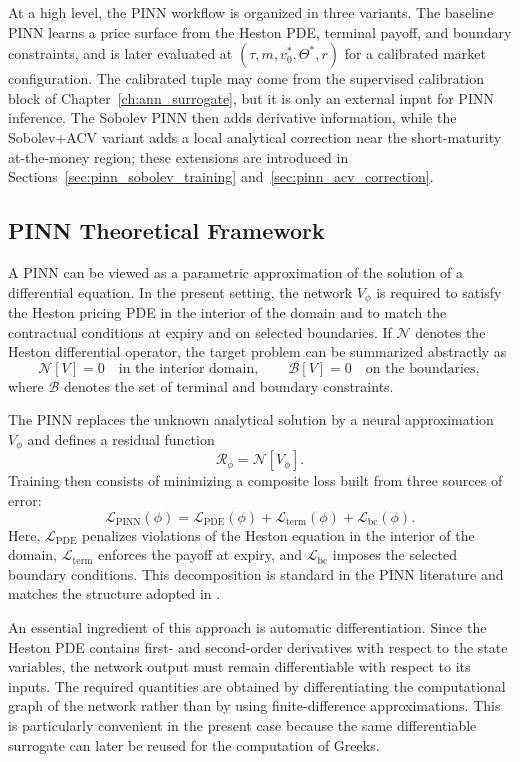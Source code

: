 At a high level, the PINN workflow is organized in three variants. The baseline PINN learns a price surface from the Heston PDE, terminal payoff, and boundary constraints, and is later evaluated at $(\tau,m,v_0^*,\Theta^*,r)$ for a calibrated market configuration. The calibrated tuple may come from the supervised calibration block of Chapter~\ref{ch:ann_surrogate}, but it is only an external input for PINN inference. The Sobolev PINN then adds derivative information, while the Sobolev+ACV variant adds a local analytical correction near the short-maturity at-the-money region; these extensions are introduced in Sections~\ref{sec:pinn_sobolev_training} and~\ref{sec:pinn_acv_correction}.

\subsection{PINN Theoretical Framework}

A PINN can be viewed as a parametric approximation of the solution of a differential equation. In the present setting, the network $V_\phi$ is required to satisfy the Heston pricing PDE in the interior of the domain and to match the contractual conditions at expiry and on selected boundaries. If $\mathcal{N}$ denotes the Heston differential operator, the target problem can be summarized abstractly as
\[
\mathcal{N}[V]=0 \quad \text{in the interior domain}, \qquad
\mathcal{B}[V]=0 \quad \text{on the boundaries},
\]
where $\mathcal{B}$ denotes the set of terminal and boundary constraints.

The PINN replaces the unknown analytical solution by a neural approximation $V_\phi$ and defines a residual function
\[
\mathcal{R}_\phi = \mathcal{N}[V_\phi].
\]
Training then consists of minimizing a composite loss built from three sources of error:
\begin{equation}
\mathcal{L}_{\mathrm{PINN}}(\phi)=
\mathcal{L}_{\mathrm{PDE}}(\phi)+
\mathcal{L}_{\mathrm{term}}(\phi)+
\mathcal{L}_{\mathrm{bc}}(\phi).
\label{eq:pinn_framework_loss}
\end{equation}
Here, \(\mathcal{L}_{\mathrm{PDE}}\) penalizes violations of the Heston equation in the interior of the domain, \(\mathcal{L}_{\mathrm{term}}\) enforces the payoff at expiry, and \(\mathcal{L}_{\mathrm{bc}}\) imposes the selected boundary conditions.
This decomposition is standard in the PINN literature and matches the structure adopted in \cite{hainaut2024pinn}.

An essential ingredient of this approach is automatic differentiation. Since the Heston PDE contains first- and second-order derivatives with respect to the state variables, the network output must remain differentiable with respect to its inputs. The required quantities are obtained by differentiating the computational graph of the network rather than by using finite-difference approximations. This is particularly convenient in the present case because the same differentiable surrogate can later be reused for the computation of Greeks.
